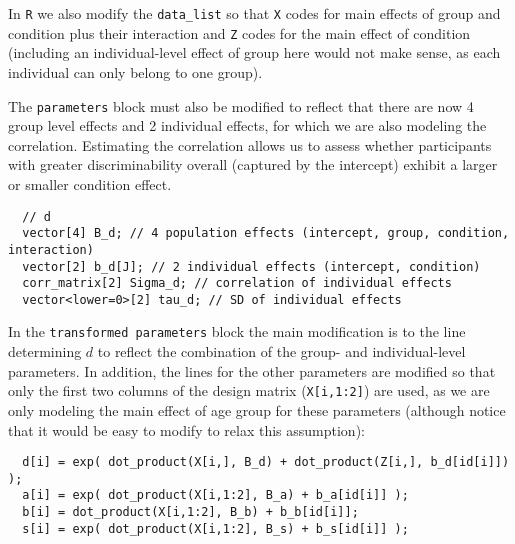 \documentclass[
  english,
  ,man,floatsintext]{apa6}
\newenvironment{Shaded}{\begin{snugshade}}{\end{snugshade}}
\newcommand{\DataTypeTok}[1]{\textcolor[rgb]{0.13,0.29,0.53}{#1}}
\newcommand{\DecValTok}[1]{\textcolor[rgb]{0.00,0.00,0.81}{#1}}
\newcommand{\KeywordTok}[1]{\textcolor[rgb]{0.13,0.29,0.53}{\textbf{#1}}}
\newcommand{\NormalTok}[1]{#1}
\newcommand{\OperatorTok}[1]{\textcolor[rgb]{0.81,0.36,0.00}{\textbf{#1}}}
\newcommand{\StringTok}[1]{\textcolor[rgb]{0.31,0.60,0.02}{#1}}
\begin{document}
In \texttt{R} we also modify the \texttt{data\_list} so that \texttt{X} codes for main effects of group and condition plus their interaction and \texttt{Z} codes for the main effect of condition (including an individual-level effect of group here would not make sense, as each individual can only belong to one group).

\begin{Shaded}
\end{Shaded}

The \texttt{parameters} block must also be modified to reflect that there are now 4 group level effects and 2 individual effects, for which we are also modeling the correlation. Estimating the correlation allows us to assess whether participants with greater discriminability overall (captured by the intercept) exhibit a larger or smaller condition effect.

\begin{verbatim}
  // d
  vector[4] B_d; // 4 population effects (intercept, group, condition, interaction)
  vector[2] b_d[J]; // 2 individual effects (intercept, condition)
  corr_matrix[2] Sigma_d; // correlation of individual effects
  vector<lower=0>[2] tau_d; // SD of individual effects
\end{verbatim}

In the \texttt{transformed\ parameters} block the main modification is to the line determining \(d\) to reflect the combination of the group- and individual-level parameters. In addition, the lines for the other parameters are modified so that only the first two columns of the design matrix (\texttt{X{[}i,1:2{]}}) are used, as we are only modeling the main effect of age group for these parameters (although notice that it would be easy to modify to relax this assumption):

\begin{verbatim}
  d[i] = exp( dot_product(X[i,], B_d) + dot_product(Z[i,], b_d[id[i]]) );
  a[i] = exp( dot_product(X[i,1:2], B_a) + b_a[id[i]] );
  b[i] = dot_product(X[i,1:2], B_b) + b_b[id[i]];
  s[i] = exp( dot_product(X[i,1:2], B_s) + b_s[id[i]] );
\end{verbatim}
\end{document}
